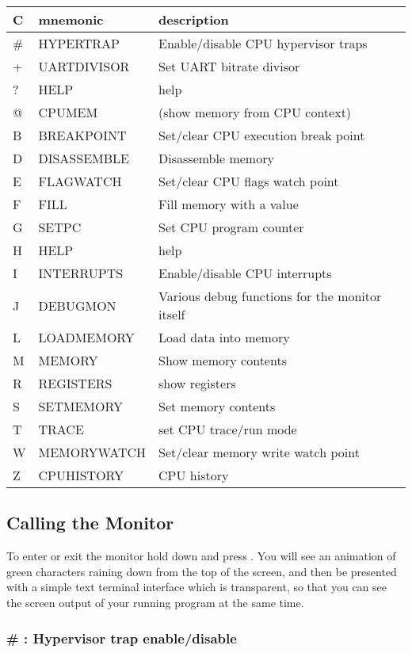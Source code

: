 {
\ttfamily
\setlength{\tabcolsep}{1mm}
\begin{center}
\begin{tabular}{|l|l|l|}
\hline
C & mnemonic & description \\
\hline
\# & HYPERTRAP & Enable/disable CPU hypervisor traps \\
+ & UARTDIVISOR & Set UART bitrate divisor \\
? & HELP & help \\
@ & CPUMEM & (show memory from CPU context) \\
\hline
B & BREAKPOINT & Set/clear CPU execution break point \\
D & DISASSEMBLE & Disassemble memory \\
E & FLAGWATCH & Set/clear CPU flags watch point \\
F & FILL & Fill memory with a value \\
G & SETPC & Set CPU program counter \\
H & HELP & help \\
I & INTERRUPTS & Enable/disable CPU interrupts \\
J & DEBUGMON & Various debug functions for the monitor itself \\
L & LOADMEMORY & Load data into memory \\
M & MEMORY & Show memory contents \\
R & REGISTERS & show registers \\
S & SETMEMORY & Set memory contents \\
T & TRACE & set CPU trace/run mode \\
W & MEMORYWATCH & Set/clear memory write watch point \\
Z & CPUHISTORY & CPU history \\
\hline
\end{tabular}
\end{center}
}

\subsection {Calling the Monitor}

To enter or exit the monitor hold down \megasymbolkey and press .
You will see an animation of green characters raining down from the top of the screen, and
then be presented with a simple text terminal interface which is transparent, so that you can
see the screen output of your running program at the same time.

\subsubsection{\# : Hypervisor trap enable/disable}

